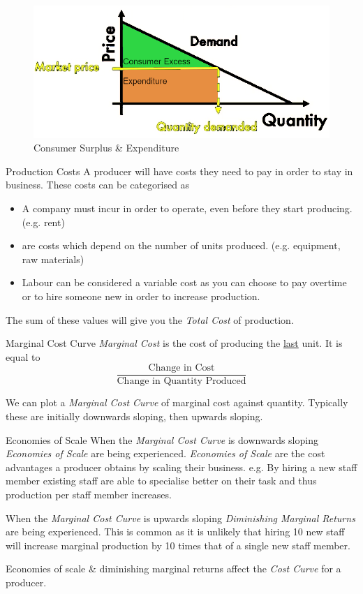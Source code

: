 \documentclass[11pt,a4paper]{article}
\begin{document}
\begin{figure}[ht!]
  \centering
  \includegraphics[width=.5\textwidth]{consumerSurplus.PNG}
  \caption{Consumer Surplus \& Expenditure}
\end{figure}

\begin{definition}{Production Costs}
  A producer will have costs they need to pay in order to stay in business. These costs can be categorised as
  \begin{itemize}
    \item[\textit{Fixed Costs}] A company must incur in order to operate, even before they start producing. (e.g. rent)
    \item[\textit{Variable Costs}] are costs which depend on the number of units produced. (e.g. equipment, raw materials)
    \item[\textit{Semi-Variable Costs}] Labour can be considered a variable cost as you can choose to pay overtime or to hire someone new in order to increase production.
  \end{itemize}
  The sum of these values will give you the \textit{Total Cost} of production.
\end{definition}

\begin{definition}{Marginal Cost Curve}
  \textit{Marginal Cost} is the cost of producing the \underline{last} unit. It is equal to
  \[ \dfrac{\text{Change in Cost}}{\text{Change in Quantity Produced}} \]
  \par We can plot a \textit{Marginal Cost Curve} of marginal cost against quantity. Typically these are initially downwards sloping, then upwards sloping.
\end{definition}

\begin{definition}{Economies of Scale}
  When the \textit{Marginal Cost Curve} is downwards sloping \textit{Economies of Scale} are being experienced. \textit{Economies of Scale} are the cost advantages a producer obtains by scaling their business. e.g. By hiring a new staff member existing staff are able to specialise better on their task and thus production per staff member increases.

  \par When the \textit{Marginal Cost Curve} is upwards sloping \textit{Diminishing Marginal Returns} are being experienced. This is common as it is unlikely that hiring 10 new staff will increase marginal production by 10 times that of a single new staff member.

  \par Economies of scale \& diminishing marginal returns affect the \textit{Cost Curve} for a producer.
\end{definition}
\end{document}

